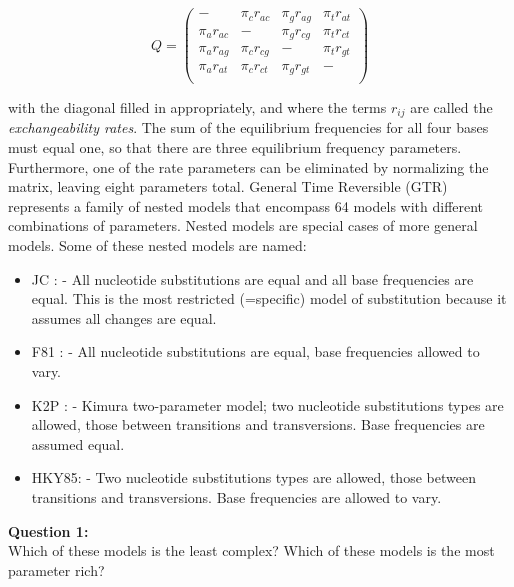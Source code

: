 \documentclass[11pt]{article}
\begin{document}
\[ Q = \left( \begin{array}{cccc}
-  &  \pi_c r_{ac}  &  \pi_g r_{ag}  &  \pi_t r_{at}  \\ 
\pi_a r_{ac}  &  -  &  \pi_g r_{cg}  &  \pi_t r_{ct}  \\ 
\pi_a r_{ag}  &  \pi_c r_{cg}  &  -  &  \pi_t r_{gt}  \\ 
\pi_a r_{at}  &  \pi_c r_{ct}  &  \pi_g r_{gt}  &  -  \\ 
\end{array} \right)\]

with the diagonal filled in appropriately, and where the terms $r_{ij}$ are called the \textit{exchangeability rates}.  The sum of the equilibrium frequencies for all four bases must equal one, so that there are three equilibrium frequency parameters.  Furthermore, one of the rate parameters can be eliminated by normalizing the matrix, leaving eight parameters total.  General Time Reversible (GTR) represents a family of nested models that encompass 64 models with different combinations of parameters.  Nested models are special cases of more general models.  
Some of these nested models are named:

\begin{itemize}

\item JC : \citet{jukes1969evolution} - All nucleotide substitutions are equal and all base frequencies are equal. This is the most restricted (=specific) model of substitution because it assumes all changes are equal.

\item F81 : \citet{felsenstein1981evolutionary} - All nucleotide substitutions are equal, base frequencies allowed to vary.

\item K2P : \citet{kimura1980simple} - Kimura two-parameter model; two nucleotide substitutions types are allowed, those between transitions and transversions. Base frequencies are assumed equal.

\item HKY85: \citet{hasegawa1985dating} - Two nucleotide substitutions types are allowed, those between transitions and transversions.  Base frequencies are allowed to vary.

\end{itemize}


\begin{framed}
\noindent
\textbf{Question 1:} \\
Which of these models is the least complex?  Which of these models is the most parameter rich?
\end{framed}
\end{document}
